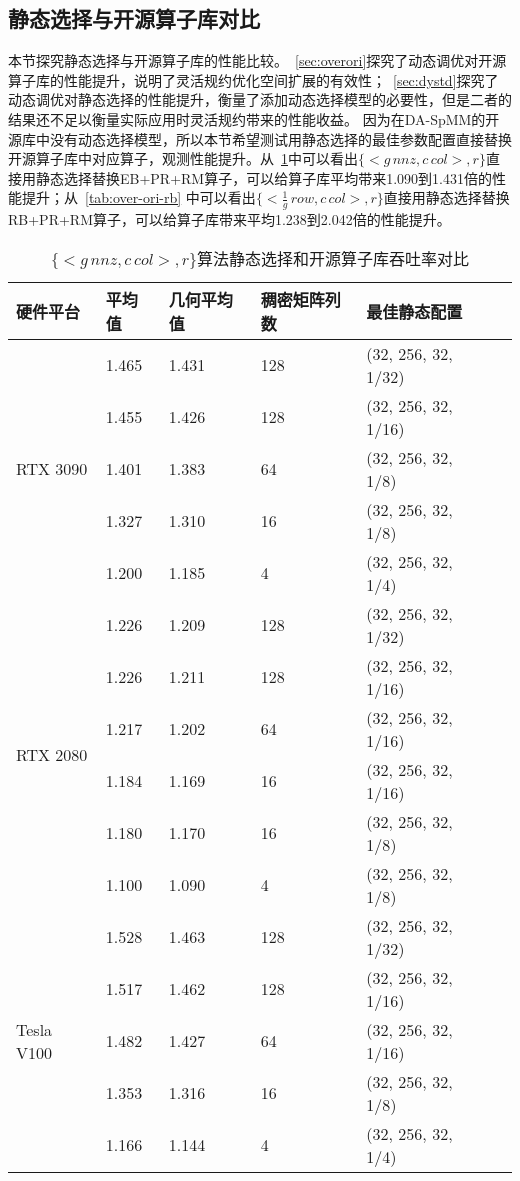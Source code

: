 \subsection{静态选择与开源算子库对比}
本节探究静态选择与开源算子库的性能比较。~\ref{sec:overori}探究了动态调优对开源算子库的性能提升，说明了灵活规约优化空间扩展的有效性；~\ref{sec:dystd}探究了动态调优对静态选择的性能提升，衡量了添加动态选择模型的必要性，但是二者的结果还不足以衡量实际应用时灵活规约带来的性能收益。
因为在DA-SpMM的开源库中没有动态选择模型，所以本节希望测试用静态选择的最佳参数配置直接替换开源算子库中对应算子，观测性能提升。从~\ref{tab:sta-ori-eb}中可以看出$\{<g\,nnz , c\,col>,r\}$直接用静态选择替换EB+PR+RM算子，可以给算子库平均带来1.090到1.431倍的性能提升；从~\ref{tab:over-ori-rb}
中可以看出$\{<\frac{1}{g}\,row , c\,col>,r\}$直接用静态选择替换RB+PR+RM算子，可以给算子库带来平均1.238到2.042倍的性能提升。
\begin{table}
  \centering
  \caption{$\{<g\,nnz , c\,col>,r\}$算法静态选择和开源算子库吞吐率对比}
  \begin{tabular}{llllll}
  \toprule
  硬件平台 & 平均值 & 几何平均值  & 稠密矩阵列数 & 最佳静态配置 \\
  \midrule
  \multirow{5}{*}{RTX 3090}& 1.465 & 1.431  & 128 & (32, 256, 32, 1/32)\\
                           & 1.455 & 1.426  & 128 & (32, 256, 32, 1/16)\\
                           & 1.401 & 1.383  & 64 & (32, 256, 32, 1/8)\\
                           & 1.327 & 1.310  & 16 & (32, 256, 32, 1/8)\\
                           & 1.200 & 1.185  & 4 & (32, 256, 32, 1/4)\\
  \hline
  \multirow{6}{*}{RTX 2080}& 1.226 & 1.209 & 128 & (32, 256, 32, 1/32)\\
                           & 1.226 & 1.211 & 128 & (32, 256, 32, 1/16)\\
                           & 1.217 & 1.202 & 64 & (32, 256, 32, 1/16)\\
                           & 1.184 & 1.169 & 16 & (32, 256, 32, 1/16)\\
                           & 1.180 & 1.170  & 16& (32, 256, 32, 1/8)\\
                           & 1.100 & 1.090  & 4 & (32, 256, 32, 1/8)\\
  \hline
  \multirow{5}{*}{Tesla V100}& 1.528 & 1.463 & 128 & (32, 256, 32, 1/32)\\
                             & 1.517 & 1.462 & 128 & (32, 256, 32, 1/16)\\
                             & 1.482 & 1.427  & 64 & (32, 256, 32, 1/16)\\
                             & 1.353 & 1.316  & 16 & (32, 256, 32, 1/8)\\
                             & 1.166 & 1.144  & 4 & (32, 256, 32, 1/4)\\
  \bottomrule
  \end{tabular}
  \label{tab:sta-ori-eb}
\end{table}
